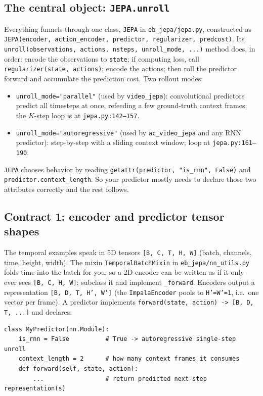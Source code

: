 \documentclass{article}
\newcommand{\code}[1]{\texttt{\small #1}}
\newcommand{\file}[1]{\texttt{\small #1}}
\begin{document}
\subsection{The central object: \texttt{JEPA.unroll}}

Everything funnels through one class, \code{JEPA} in \file{eb\_jepa/jepa.py},
constructed as \code{JEPA(encoder, action\_encoder, predictor, regularizer,
predcost)}. Its \code{unroll(observations, actions, nsteps, unroll\_mode, ...)}
method does, in order: encode the observations to \code{state}; if computing loss,
call \code{regularizer(state, actions)}; encode the actions; then roll the
predictor forward and accumulate the prediction cost. Two rollout modes:

\begin{itemize}[leftmargin=1.4em,itemsep=2pt,topsep=2pt]
  \item \code{unroll\_mode="parallel"} (used by \code{video\_jepa}): convolutional
    predictors predict all timesteps at once, refeeding a few ground-truth context
    frames; the $K$-step loop is at \file{jepa.py}\code{:142--157}.
  \item \code{unroll\_mode="autoregressive"} (used by \code{ac\_video\_jepa} and
    any RNN predictor): step-by-step with a sliding context window; loop at
    \file{jepa.py}\code{:161--190}.
\end{itemize}
\code{JEPA} chooses behavior by reading \code{getattr(predictor, "is\_rnn", False)}
and \code{predictor.context\_length}. So your predictor mostly needs to declare
those two attributes correctly and the rest follows.

\subsection{Contract 1: encoder and predictor tensor shapes}

The temporal examples speak in 5D tensors \code{[B, C, T, H, W]} (batch, channels,
time, height, width). The mixin \code{TemporalBatchMixin} in
\file{eb\_jepa/nn\_utils.py} folds time into the batch for you, so a 2D encoder can
be written as if it only ever sees \code{[B, C, H, W]}; subclass it and implement
\code{\_forward}. Encoders output a representation \code{[B, D, T, H', W']} (the
\code{ImpalaEncoder} pools to \code{H'{=}W'{=}1}, i.e.\ one vector per frame). A
predictor implements \code{forward(state, action) -> [B, D, T, ...]} and declares:

\begin{lstlisting}[style=py]
class MyPredictor(nn.Module):
    is_rnn = False          # True -> autoregressive single-step unroll
    context_length = 2      # how many context frames it consumes
    def forward(self, state, action):
        ...                 # return predicted next-step representation(s)
\end{lstlisting}
\end{document}
